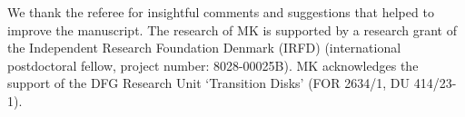 \documentclass{aa}
\begin{document}
\begin{acknowledgements}
We thank the referee for insightful comments and suggestions that helped to improve the manuscript. 
The research of MK is supported by a research grant of the Independent Research Foundation Denmark (IRFD) (international postdoctoral fellow, project number: 8028-00025B). 
MK acknowledges the support of the DFG Research Unit `Transition Disks' (FOR 2634/1, DU 414/23-1). 
\end{acknowledgements}



\end{document}

